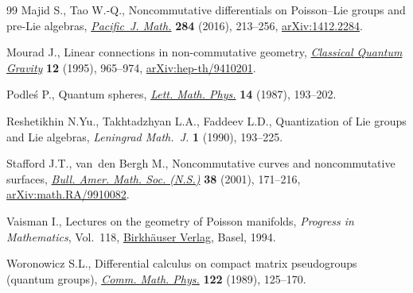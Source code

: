 \documentclass[10pt,a4paper]{amsart}
\numberwithin{equation}{section}
\newcommand{\<}{{\langle}}
\renewcommand{\>}{{\rangle}}
\begin{document}
\begin{thebibliography}{99}
Majid S., Tao W.-Q., Noncommutative differentials on {P}oisson--{L}ie groups and
 pre-{L}ie algebras, \href{https://doi.org/10.2140/pjm.2016.284.213}{\textit{Pacific~J. Math.}} \textbf{284} (2016), 213--256,
 \href{https://arxiv.org/abs/1412.2284}{arXiv:1412.2284}.

Mourad J., Linear connections in non-commutative geometry, \href{https://doi.org/10.1088/0264-9381/12/4/007}{\textit{Classical
 Quantum Gravity}} \textbf{12} (1995), 965--974, \href{https://arxiv.org/abs/hep-th/9410201}{arXiv:hep-th/9410201}.

Podle\'s P., Quantum spheres, \href{https://doi.org/10.1007/BF00416848}{\textit{Lett. Math. Phys.}} \textbf{14} (1987),
 193--202.

Reshetikhin N.Yu., Takhtadzhyan L.A., Faddeev L.D., Quantization of {L}ie groups
 and {L}ie algebras, \textit{Leningrad Math.~J.} \textbf{1} (1990), 193--225.

Stafford J.T., van~den Bergh M., Noncommutative curves and noncommutative
 surfaces, \href{https://doi.org/10.1090/S0273-0979-01-00894-1}{\textit{Bull. Amer. Math. Soc. (N.S.)}} \textbf{38} (2001),
 171--216, \href{https://arxiv.org/abs/math.RA/9910082}{arXiv:math.RA/9910082}.

Vaisman I., Lectures on the geometry of {P}oisson manifolds, \textit{Progress
 in Mathematics}, Vol.~118, \href{https://doi.org/10.1007/978-3-0348-8495-2}{Birkh\"auser Verlag}, Basel, 1994.

Woronowicz S.L., Differential calculus on compact matrix pseudogroups (quantum
 groups), \href{https://doi.org/10.1007/BF01221411}{\textit{Comm. Math. Phys.}} \textbf{122} (1989), 125--170.

\end{thebibliography}
\end{document}
